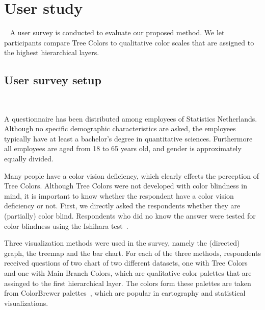 \documentclass[journal]{vgtc}                %
\begin{document}
\section{User study}~\label{secuser}
A user survey is conducted to evaluate our proposed method. We let participants compare Tree Colors to qualitative color scales that are assigned to the highest hierarchical layers.


\subsection{User survey setup}~\label{secusersetup}

A questionnaire has been distributed among employees of Statistics Netherlands. Although no specific demographic characteristics are asked, the employees typically have at least a bachelor's degree in quantitative sciences. Furthermore all employees are aged from 18 to 65 years old, and gender is approximately equally divided.

Many people have a color vision deficiency, which clearly effects the perception of Tree Colors. Although Tree Colors were not developed with color blindness in mind, it is important to know whether the respondent have a color vision deficiency or not. First, we directly asked the respondents whether they are (partially) color blind. Respondents who did no know the answer were tested for color blindness using the Ishihara test~\cite{ishihara}. 

Three visualization methods were used in the survey, namely the (directed) graph, the treemap and the bar chart. For each of the three methods, respondents received questions of two chart of two different datasets, one with Tree Colors and one with Main Branch Colors, which are qualitative color palettes that are assinged to the first hierarchical layer. The colors form these palettes are taken from ColorBrewer palettes~\cite{brewer03}, which are popular in cartography and statistical visualizations.
\end{document}
